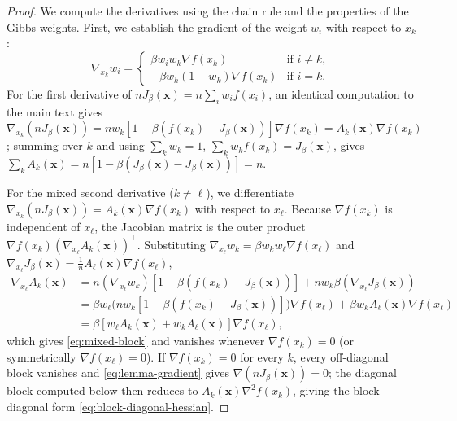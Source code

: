 \documentclass{opt2026} %
\newcommand{\prefactor}[2]{A_{#1}(#2)}
\newcommand{\xx}{\mathbf{x}}
\begin{document}
\begin{proof}
    We compute the derivatives using the chain rule and the properties of the Gibbs weights. First, we establish the gradient of the weight $w_i$ with respect to $x_k$:
    \begin{equation*}
        \nabla_{x_k} w_i = \begin{cases}
            \beta w_i w_k \nabla f(x_k) & \text{if } i \neq k, \\
            -\beta w_k (1 - w_k) \nabla f(x_k) & \text{if } i = k.
        \end{cases}
    \end{equation*}
    For the first derivative of $nJ_\beta(\xx) = n\sum_i w_i f(x_i)$, an identical computation to the main text gives $\nabla_{x_k}(nJ_\beta(\xx)) = nw_k[1-\beta(f(x_k)-J_\beta(\xx))]\nabla f(x_k) = \prefactor{k}{\xx}\nabla f(x_k)$; summing over $k$ and using $\sum_k w_k=1$, $\sum_k w_kf(x_k)=J_\beta(\xx)$, gives $\sum_k\prefactor{k}{\xx}=n[1-\beta(J_\beta(\xx)-J_\beta(\xx))]=n$.

    For the mixed second derivative ($k\ne\ell$), we differentiate $\nabla_{x_k}(nJ_\beta(\xx))=\prefactor{k}{\xx}\nabla f(x_k)$ with respect to $x_\ell$. Because $\nabla f(x_k)$ is independent of $x_\ell$, the Jacobian matrix is the outer product $\nabla f(x_k)(\nabla_{x_\ell}\prefactor{k}{\xx})^\top$. Substituting $\nabla_{x_\ell}w_k=\beta w_kw_\ell\nabla f(x_\ell)$ and $\nabla_{x_\ell}J_\beta(\xx)=\frac1n\prefactor{\ell}{\xx}\nabla f(x_\ell)$,
    \begin{align*}
        \nabla_{x_\ell}\prefactor{k}{\xx} &= n(\nabla_{x_\ell}w_k)\left[1-\beta(f(x_k)-J_\beta(\xx))\right] + nw_k\beta\left(\nabla_{x_\ell}J_\beta(\xx)\right) \\
        &= \beta w_\ell\bigl(nw_k[1-\beta(f(x_k)-J_\beta(\xx))]\bigr)\nabla f(x_\ell) + \beta w_k\prefactor{\ell}{\xx}\nabla f(x_\ell) \\
        &= \beta\left[w_\ell\prefactor{k}{\xx}+w_k\prefactor{\ell}{\xx}\right]\nabla f(x_\ell),
    \end{align*}
    which gives \eqref{eq:mixed-block} and vanishes whenever $\nabla f(x_k)=0$ (or symmetrically $\nabla f(x_\ell)=0$). If $\nabla f(x_k)=0$ for every $k$, every off-diagonal block vanishes and \eqref{eq:lemma-gradient} gives $\nabla(nJ_\beta(\xx))=0$; the diagonal block computed below then reduces to $\prefactor{k}{\xx}\nabla^2f(x_k)$, giving the block-diagonal form \eqref{eq:block-diagonal-hessian}.


\end{proof}
\end{document}
